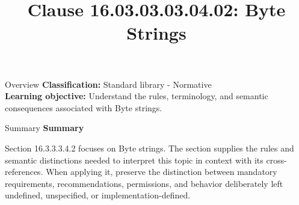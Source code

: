 \documentclass[10pt,letterpaper]{article}
\title{Clause 16.03.03.03.04.02: Byte Strings}
\author{}
\date{}
\begin{document}
\maketitle
\begin{CornellOverviewBox}{Overview}
\textbf{Classification:} Standard library - Normative\\[2pt]
\textbf{Learning objective:} Understand the rules, terminology, and semantic consequences associated with Byte strings.
\end{CornellOverviewBox}\begin{CornellSummaryBox}{Summary}
{\sffamily\bfseries\color{Accent} Summary}\par\vspace{3pt}Section 16.3.3.3.4.2 focuses on Byte strings. The section supplies the rules and semantic distinctions needed to interpret this topic in context with its cross-references. When applying it, preserve the distinction between mandatory requirements, recommendations, permissions, and behavior deliberately left undefined, unspecified, or implementation-defined.
\end{CornellSummaryBox}
\end{document}
